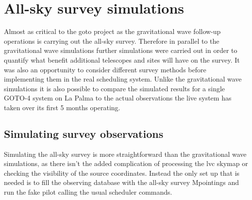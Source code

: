 \begin{colsection}
\begin{colsection}
\end{colsection}


\end{colsection}


\newpage
\section{All-sky survey simulations}
\label{sec:allsky_sims}
\begin{colsection}


\begin{colsection}

Almost as critical to the \gls{goto} project as the gravitational wave follow-up operations is carrying out the all-sky survey. Therefore in parallel to the gravitational wave simulations further simulations were carried out in order to quantify what benefit additional telescopes and sites will have on the survey. It was also an opportunity to consider different survey methods before implementing them in the real scheduling system. Unlike the gravitational wave simulations it is also possible to compare the simulated results for a single GOTO-4 system on La Palma to the actual observations the live system has taken over its first 5 months operating.

\end{colsection}


\subsection{Simulating survey observations}
\label{sec:allsky_sim_methods}
\begin{colsection}

Simulating the all-sky survey is more straightforward than the gravitational wave simulations, as there isn't the added complication of processing the \gls{lvc} skymap or checking the visibility of the source coordinates. Instead the only set up that is needed is to fill the observing database with the all-sky survey Mpointings and run the fake pilot calling the usual scheduler commands.


\end{colsection}
\end{colsection}
